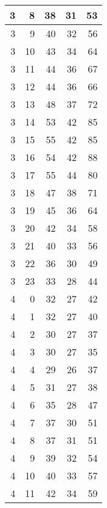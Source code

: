 \begin{longtable}{|r|r|r|r|r|}
    \hline
    3     & 8     & 38    & 31    & 53 \\
    \hline
    3     & 9     & 40    & 32    & 56 \\
    \hline
    3     & 10    & 43    & 34    & 64 \\
    \hline
    3     & 11    & 44    & 36    & 67 \\
    \hline
    3     & 12    & 44    & 36    & 66 \\
    \hline
    3     & 13    & 48    & 37    & 72 \\
    \hline
    3     & 14    & 53    & 42    & 85 \\
    \hline
    3     & 15    & 55    & 42    & 85 \\
    \hline
    3     & 16    & 54    & 42    & 88 \\
    \hline
    3     & 17    & 55    & 44    & 80 \\
    \hline
    3     & 18    & 47    & 38    & 71 \\
    \hline
    3     & 19    & 45    & 36    & 64 \\
    \hline
    3     & 20    & 42    & 34    & 58 \\
    \hline
    3     & 21    & 40    & 33    & 56 \\
    \hline
    3     & 22    & 36    & 30    & 49 \\
    \hline
    3     & 23    & 33    & 28    & 44 \\
    \hline
    4     & 0     & 32    & 27    & 42 \\
    \hline
    4     & 1     & 32    & 27    & 40 \\
    \hline
    4     & 2     & 30    & 27    & 37 \\
    \hline
    4     & 3     & 30    & 27    & 35 \\
    \hline
    4     & 4     & 29    & 26    & 37 \\
    \hline
    4     & 5     & 31    & 27    & 38 \\
    \hline
    4     & 6     & 35    & 28    & 47 \\
    \hline
    4     & 7     & 37    & 30    & 51 \\
    \hline
    4     & 8     & 37    & 31    & 51 \\
    \hline
    4     & 9     & 39    & 32    & 54 \\
    \hline
    4     & 10    & 40    & 33    & 57 \\
    \hline
    4     & 11    & 42    & 34    & 59 \\

\end{longtable}
